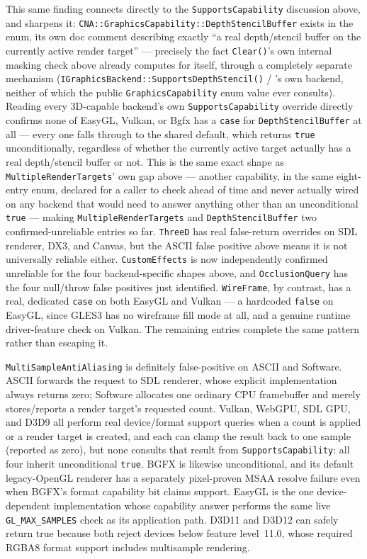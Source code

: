 This same finding connects directly to the \texttt{SupportsCapability} discussion above, and
sharpens it: \texttt{CNA::GraphicsCapability::DepthStencilBuffer} exists in the enum, its own doc
comment describing exactly ``a real depth/stencil buffer on the currently active render
target'' --- precisely the fact \texttt{Clear()}'s own internal masking check above already
computes for itself, through a completely separate mechanism
(\texttt{IGraphicsBackend::SupportsDepthStencil()} / 's own backend,
neither of which the public \texttt{GraphicsCapability} enum value ever consults). Reading every
3D-capable backend's own \texttt{SupportsCapability} override directly confirms none of EasyGL,
Vulkan, or Bgfx has a \texttt{case} for \texttt{DepthStencilBuffer} at all --- every one falls
through to the shared default, which returns \texttt{true} unconditionally, regardless of
whether the currently active target actually has a real depth/stencil buffer or not. This is the
same exact shape as \texttt{MultipleRenderTargets}' own gap above --- another capability, in the
same eight-entry enum, declared for a caller to check ahead of time and never actually wired on
any backend that would need to answer anything other than an unconditional \texttt{true} ---
making \texttt{MultipleRenderTargets} and \texttt{DepthStencilBuffer} two confirmed-unreliable
entries so far. \texttt{ThreeD} has real false-return overrides on SDL renderer, DX3, and
Canvas, but the ASCII false positive above means it is not universally reliable either.
\texttt{CustomEffects} is now independently confirmed unreliable for the four backend-specific
shapes above, and \texttt{OcclusionQuery} has the four null/throw false positives just
identified. \texttt{WireFrame}, by contrast, has a real, dedicated \texttt{case} on both
EasyGL and Vulkan --- a hardcoded \texttt{false} on EasyGL, since GLES3 has no wireframe fill
mode at all, and a genuine runtime driver-feature check on Vulkan. The remaining entries
complete the same pattern rather than escaping it.

\texttt{MultiSampleAntiAliasing} is definitely false-positive on ASCII and Software. ASCII
forwards the request to SDL renderer, whose explicit implementation always returns zero;
Software allocates one ordinary CPU framebuffer and merely stores/reports a render target's
requested count. Vulkan, WebGPU, SDL GPU, and D3D9 all perform real device/format support
queries when a count is applied or a render target is created, and each can clamp the result
back to one sample (reported as zero), but none consults that result from
\texttt{SupportsCapability}: all four inherit unconditional \texttt{true}. BGFX is likewise
unconditional, and its default legacy-OpenGL renderer has a separately pixel-proven MSAA
resolve failure even when BGFX's format capability bit claims support. EasyGL is the one
device-dependent implementation whose capability answer performs the same live
\texttt{GL\_MAX\_SAMPLES} check as its application path. D3D11 and D3D12 can safely return
true because both reject devices below feature level~11.0, whose required RGBA8 format support
includes multisample rendering.

